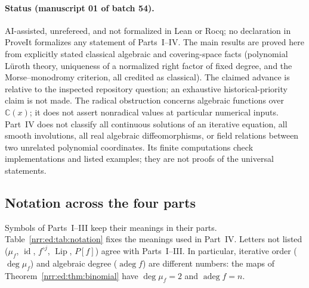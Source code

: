 \documentclass[11pt,letterpaper]{article}
\theoremstyle{definition}
\theoremstyle{remark}
\newcommand{\C}{\mathbb C}
\newcommand{\id}{\operatorname{id}}
\newcommand{\algdeg}{\operatorname{adeg}}
\begin{document}
\paragraph{Status (manuscript 01 of batch 54).}
AI-assisted, unrefereed, and not formalized in Lean or Rocq; no declaration in
ProveIt formalizes any statement of Parts~I--IV. The main results are proved
here from explicitly stated classical algebraic and covering-space facts
(polynomial L\"uroth theory, uniqueness of a normalized right factor of fixed
degree, and the Morse--monodromy criterion, all credited as classical). The
claimed advance is relative to the inspected repository question; an
exhaustive historical-priority claim is not made. The radical obstruction
concerns algebraic functions over $\C(x)$; it does not assert nonradical
values at particular numerical inputs. Part~IV does not classify all
continuous solutions of an iterative equation, all smooth involutions, all
real algebraic diffeomorphisms, or field relations between two unrelated
polynomial coordinates. Its finite computations check implementations and
listed examples; they are not proofs of the universal statements.

\subsection{Notation across the four parts}
\label{nrr:ed:sec:notation}

Symbols of Parts~I--III keep their meanings in their parts.
Table~\ref{nrr:ed:tab:notation} fixes the meanings used in Part~IV. Letters
not listed ($\mu_f$, $\id$, $f^{\circ j}$, $\operatorname{Lip}$, $P[f]$)
agree with Parts~I--III. In particular, iterative order ($\deg\mu_f$) and
algebraic degree ($\algdeg f$) are different numbers: the maps of
Theorem~\ref{nrr:ed:thm:binomial} have $\deg\mu_f=2$ and $\algdeg f=n$.
\end{document}
